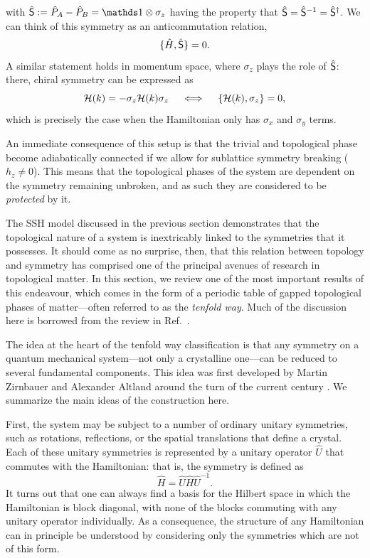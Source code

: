 with $\hat{\CHR}:= \hat{P}_A - \hat{P}_B = \Id\otimes\sigma_z$ having the property that $\hat{\mathsf{S}} = \hat{\mathsf{S}}^{-1} = \hat{\mathsf{S}}^\dag$. We can think of this symmetry as an anticommutation relation,
\begin{equation}\label{eq:chiral-operator}
	\{\hat{H},\hat{\mathsf{S}}\} = 0.
\end{equation}
A similar statement holds in momentum space, where $\sigma_z$ plays the role of $\hat{\mathsf{S}}$: there, chiral symmetry can be expressed as
\begin{equation}\label{eq:chiral-momentum}
	\mathcal{H}(k) = -\sigma_z\mathcal{H}(k)\sigma_z \quad\iff\quad \{\mathcal{H}(k),\sigma_z\} = 0,
\end{equation}
which is precisely the case when the Hamiltonian only has $\sigma_x$ and $\sigma_y$ terms.

An immediate consequence of this setup is that the trivial and topological phase become adiabatically connected if we allow for sublattice symmetry breaking ($h_z \neq 0$). This means that the topological phases of the system are dependent on the symmetry remaining unbroken, and as such they are considered to be \emph{protected} by it.


\label{sec:symm-classes}

The SSH model discussed in the previous section demonstrates that the topological nature of a system is inextricably linked to the symmetries that it possesses. It should come as no surprise, then, that this relation between topology and symmetry has comprised one of the principal avenues of research in topological matter. In this section, we review one of the most important results of this endeavour, which comes in the form of a periodic table of gapped topological phases of matter---often referred to as the \emph{tenfold way}. Much of the discussion here is borrowed from the review in Ref.~\cite{Ludwig_tenfold-way}.

The idea at the heart of the tenfold way classification is that any symmetry on a quantum mechanical system---not only a crystalline one---can be reduced to several fundamental components. This idea was first developed by Martin Zirnbauer and Alexander Altland around the turn of the current century \cite{Zirnbauer_random-matrix,AltlandZirnbauer_symm-classes,Heinzner_symm-classes}. We summarize the main ideas of the construction here.

First, the system may be subject to a number of ordinary unitary symmetries, such as rotations, reflections, or the spatial translations that define a crystal. Each of these unitary symmetries is represented by a unitary operator $\hat{U}$ that commutes with the Hamiltonian: that is, the symmetry is defined as
\begin{equation*}
	\hat{H} = \hat{U}\hat{H}\hat{U}^{-1}.
\end{equation*}
It turns out that one can always find a basis for the Hilbert space in which the Hamiltonian is block diagonal, with none of the blocks commuting with any unitary operator individually. As a consequence, the structure of any Hamiltonian can in principle be understood by considering only the symmetries which are not of this form.

